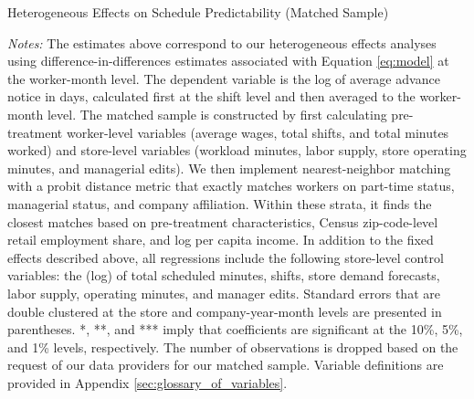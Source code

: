 \documentclass[letterpaper,11pt,leqno]{article}
\theoremstyle{paper}
\newcommand{\note}[2][]{\parbox{\textwidth}{\footnotesize\vspace*{10pt}\textit{#1}#2}}
\begin{document}
\begin{singlespace}
\begin{table}[h]
\caption{Heterogeneous Effects on Schedule Predictability (Matched Sample)}

\note{\scriptsize\textit{Notes: }The estimates above correspond to our heterogeneous effects analyses using difference-in-differences estimates associated with Equation \ref{eq:model} at the worker-month level. The dependent variable is the log of average advance notice in days, calculated first at the shift level and then averaged to the worker-month level. The matched sample is constructed by first calculating pre-treatment worker-level variables (average wages, total shifts, and total minutes worked) and store-level variables (workload minutes, labor supply, store operating minutes, and managerial edits). We then implement nearest-neighbor matching with a probit distance metric that exactly matches workers on part-time status, managerial status, and company affiliation. Within these strata, it finds the closest matches based on pre-treatment characteristics, Census zip-code-level retail employment share, and log per capita income. In addition to the fixed effects described above, all regressions include the following store-level control variables: the (log) of total scheduled minutes, shifts, store demand forecasts, labor supply, operating minutes, and manager edits. Standard errors that are double clustered at the store and company-year-month levels are presented in parentheses. *, **, and *** imply that coefficients are significant at the 10\%, 5\%, and 1\% levels, respectively. The number of observations is dropped based on the request of our data providers for our matched sample. Variable definitions are provided in Appendix \ref{sec:glossary_of_variables}.}
\label{table:adv_notice_het_effects_matched}
\end{table}
\end{singlespace}
\end{document}
